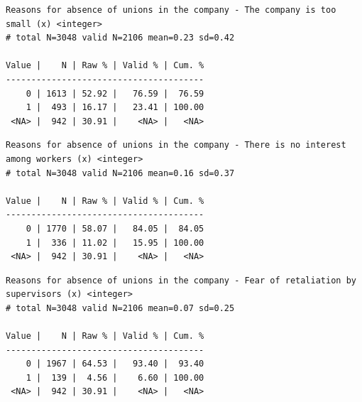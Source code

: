 \documentclass[
  letterpaper,
  DIV=11,
  numbers=noendperiod]{scrreprt}
\newenvironment{Shaded}{\begin{snugshade}}{\end{snugshade}}
\newcommand{\FunctionTok}[1]{\textcolor[rgb]{0.28,0.35,0.67}{#1}}
\newcommand{\NormalTok}[1]{\textcolor[rgb]{0.00,0.23,0.31}{#1}}
\newcommand{\SpecialCharTok}[1]{\textcolor[rgb]{0.37,0.37,0.37}{#1}}
\begin{document}
\begin{Shaded}
\end{Shaded}

\begin{verbatim}
Reasons for absence of unions in the company - The company is too small (x) <integer> 
# total N=3048 valid N=2106 mean=0.23 sd=0.42

Value |    N | Raw % | Valid % | Cum. %
---------------------------------------
    0 | 1613 | 52.92 |   76.59 |  76.59
    1 |  493 | 16.17 |   23.41 | 100.00
 <NA> |  942 | 30.91 |    <NA> |   <NA>
\end{verbatim}

\begin{Shaded}
\end{Shaded}

\begin{verbatim}
Reasons for absence of unions in the company - There is no interest among workers (x) <integer> 
# total N=3048 valid N=2106 mean=0.16 sd=0.37

Value |    N | Raw % | Valid % | Cum. %
---------------------------------------
    0 | 1770 | 58.07 |   84.05 |  84.05
    1 |  336 | 11.02 |   15.95 | 100.00
 <NA> |  942 | 30.91 |    <NA> |   <NA>
\end{verbatim}

\begin{Shaded}
\end{Shaded}

\begin{verbatim}
Reasons for absence of unions in the company - Fear of retaliation by supervisors (x) <integer> 
# total N=3048 valid N=2106 mean=0.07 sd=0.25

Value |    N | Raw % | Valid % | Cum. %
---------------------------------------
    0 | 1967 | 64.53 |   93.40 |  93.40
    1 |  139 |  4.56 |    6.60 | 100.00
 <NA> |  942 | 30.91 |    <NA> |   <NA>
\end{verbatim}
\end{document}
